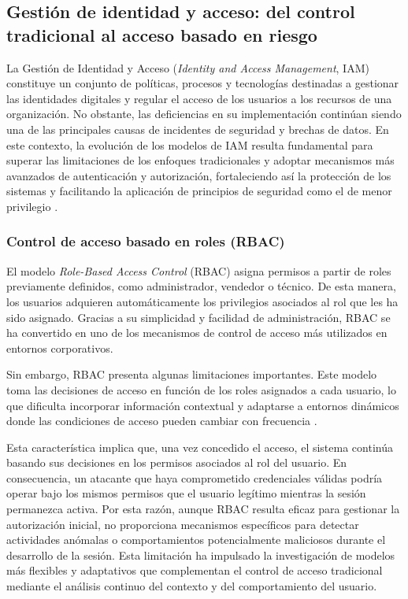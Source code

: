 \subsection{Gestión de identidad y acceso: del control tradicional al acceso basado en riesgo}
La Gestión de Identidad y Acceso (\emph{Identity and Access Management}, IAM) constituye un conjunto de políticas, procesos y tecnologías destinadas a gestionar las identidades digitales y regular el acceso de los usuarios a los recursos de una organización. No obstante, las deficiencias en su implementación continúan siendo una de las principales causas de incidentes de seguridad y brechas de datos. En este contexto, la evolución de los modelos de IAM resulta fundamental para superar las limitaciones de los enfoques tradicionales y adoptar mecanismos más avanzados de autenticación y autorización, fortaleciendo así la protección de los sistemas y facilitando la aplicación de principios de seguridad como el de menor privilegio \parencite{Glockler2023}.

\subsubsection{Control de acceso basado en roles (RBAC)}
El modelo \emph{Role-Based Access Control} (RBAC) asigna permisos a partir de roles previamente definidos, como administrador, vendedor o técnico. De esta manera, los usuarios adquieren automáticamente los privilegios asociados al rol que les ha sido asignado. Gracias a su simplicidad y facilidad de administración, RBAC se ha convertido en uno de los mecanismos de control de acceso más utilizados en entornos corporativos.

Sin embargo, RBAC presenta algunas limitaciones importantes. Este modelo toma las decisiones de acceso en función de los roles asignados a cada usuario, lo que dificulta incorporar información contextual y adaptarse a entornos dinámicos donde las condiciones de acceso pueden cambiar con frecuencia \parencite{Kuhn2010}.

Esta característica implica que, una vez concedido el acceso, el sistema continúa basando sus decisiones en los permisos asociados al rol del usuario. En consecuencia, un atacante que haya comprometido credenciales válidas podría operar bajo los mismos permisos que el usuario legítimo mientras la sesión permanezca activa. Por esta razón, aunque RBAC resulta eficaz para gestionar la autorización inicial, no proporciona mecanismos específicos para detectar actividades anómalas o comportamientos potencialmente maliciosos durante el desarrollo de la sesión. Esta limitación ha impulsado la investigación de modelos más flexibles y adaptativos que complementan el control de acceso tradicional mediante el análisis continuo del contexto y del comportamiento del usuario.

